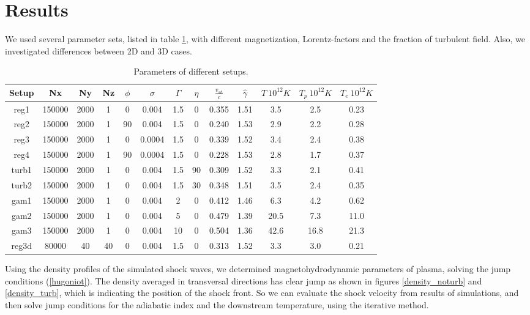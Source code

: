 \documentclass[a4paper]{jpconf}
\begin{document}
	\section{Results}
	We used several parameter sets, listed in table \ref{setups}, with different magnetization, Lorentz-factors and the fraction of turbulent field. Also, we investigated differences between 2D and 3D cases.
	\begin{table}[h!]
		\label{setups}
		\begin{center}
			\begin{tabular}{|c | c| c | c| c| c| c| c| c| c| c| c| c|}
				\hline
				Setup & Nx & Ny & Nz & $\phi$ & $\sigma$ & $\Gamma$ & $\eta$ & $\frac{v_{sh}}{c}$ & $\hat{\gamma}$ & $T \ 10^{12} K$ & $T_p\ 10^{12}K$ & $T_e \ 10^{12}K$\\
				\hline
				reg1 & 150000 & 2000 & 1 & 0 & 0.004 & 1.5 & 0 & 0.355 & 1.51 & 3.5 & 2.5 & 0.23\\
				reg2 & 150000 & 2000 & 1 & 90 & 0.004 & 1.5 & 0 & 0.240 & 1.53 & 2.9 & 2.2 & 0.28\\
				reg3 & 150000 & 2000 & 1 & 0 & 0.0004 & 1.5 & 0 & 0.339 & 1.52 & 3.4 &2.4 & 0.38\\
				reg4 & 150000 & 2000 & 1 & 90 & 0.0004 & 1.5 & 0 & 0.228 & 1.53 & 2.8 &1.7 & 0.37\\
				turb1 & 150000 & 2000 & 1 & 0 & 0.004 & 1.5 & 90 & 0.309 & 1.52 & 3.3 & 2.1 & 0.41\\
				turb2 & 150000 & 2000 & 1 & 0 & 0.004 & 1.5 & 30 & 0.348 & 1.51 & 3.5 & 2.4 & 0.35\\
				gam1 & 150000 & 2000 & 1 & 0 & 0.004 & 2 & 0 & 0.412 & 1.46 & 6.3 & 4.2 & 0.62\\
				gam2 & 150000 & 2000 & 1 & 0 & 0.004 & 5 & 0 & 0.479 & 1.39 & 20.5 & 7.3 & 11.0\\
				gam3 & 150000 & 2000 & 1 & 0 & 0.004 & 10 & 0 & 0.504 & 1.36 & 42.6 & 16.8 & 21.3\\
				reg3d & 80000 & 40 & 40 & 0 & 0.004 & 1.5 & 0 & 0.313 & 1.52 & 3.3 & 3.0 & 0.21\\
				
				\hline
			\end{tabular}
		\end{center}
		\caption{Parameters of different setups. }
	\end{table}
	
	Using the density profiles of the simulated shock waves, we determined magnetohydrodynamic parameters of plasma, solving the jump conditions (\ref{hugoniot}). The density averaged in transversal directions has clear jump as shown in figures \ref{density_noturb} and \ref{density_turb}, which is indicating the position of the shock front. So we can evaluate the shock velocity from results of simulations, and then solve jump conditions for the adiabatic index and the downstream temperature, using the iterative method. 
	
\end{document}
